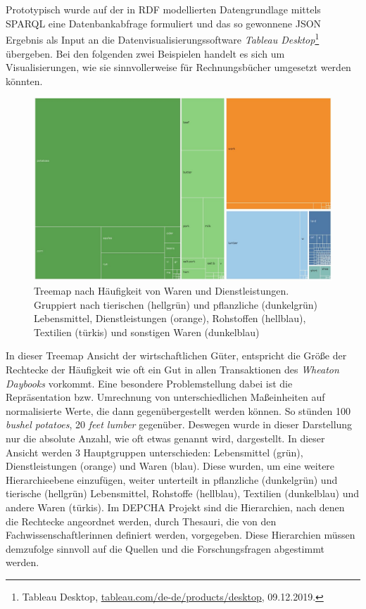 \documentclass[12pt,a4paper]{article}
\begin{document}
\\
\\
Prototypisch wurde auf der in RDF modellierten Datengrundlage mittels SPARQL eine Datenbankabfrage formuliert und das so gewonnene JSON Ergebnis als Input an die Datenvisualisierungssoftware \textit{Tableau Desktop}\footnote{Tableau Desktop, \url{tableau.com/de-de/products/desktop}, 09.12.2019.} übergeben. Bei den folgenden zwei Beispielen handelt es sich um Visualisierungen, wie sie sinnvollerweise für Rechnungsbücher umgesetzt werden könnten.
\begin{figure}[H]
\centering
	\includegraphics[width=1\textwidth]{img/infovis1.jpg}  
    \caption[Treemap nach Häufigkeit von Waren und Dienstleistungen. Gruppiert nach tierischen (hellgrün) und pflanzliche (dunkelgrün) Lebensmittel, Dienstleistungen (orange), Rohstoffen (hellblau), Textilien (türkis) und sonstigen Waren (dunkelblau), eigene Darstellung, erstellt mit Tableau Desktop]{Treemap nach Häufigkeit von Waren und Dienstleistungen. Gruppiert nach tierischen (hellgrün) und pflanzliche (dunkelgrün) Lebensmittel, Dienstleistungen (orange), Rohstoffen (hellblau), Textilien (türkis) und sonstigen Waren (dunkelblau)} \label{fig:InfoVis1}
\end{figure}
In dieser Treemap Ansicht der wirtschaftlichen Güter, entspricht die Größe der Rechtecke der Häufigkeit wie oft ein Gut in allen Transaktionen des \textit{Wheaton Daybooks} vorkommt. Eine besondere Problemstellung dabei ist die Repräsentation bzw. Umrechnung von unterschiedlichen Maßeinheiten auf normalisierte Werte, die dann gegenübergestellt werden können. So stünden 100 \textit{bushel potatoes}, 20 \textit{feet lumber} gegenüber. Deswegen wurde in dieser Darstellung nur die absolute Anzahl, wie oft etwas genannt wird, dargestellt. In dieser Ansicht werden 3 Hauptgruppen unterschieden: Lebensmittel (grün), Dienstleistungen (orange) und Waren (blau). Diese wurden, um eine weitere Hierarchieebene einzufügen, weiter unterteilt in pflanzliche (dunkelgrün) und tierische (hellgrün) Lebensmittel, Rohstoffe (hellblau), Textilien (dunkelblau) und andere Waren (türkis). Im DEPCHA Projekt sind die Hierarchien, nach denen die Rechtecke angeordnet werden, durch Thesauri, die von den Fachwissenschaftlerinnen definiert werden, vorgegeben. Diese Hierarchien müssen demzufolge sinnvoll auf die Quellen und die Forschungsfragen abgestimmt werden.
\end{document}
